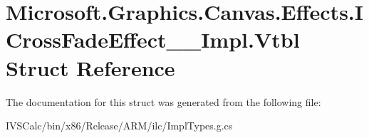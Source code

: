 \hypertarget{struct_microsoft_1_1_graphics_1_1_canvas_1_1_effects_1_1_i_cross_fade_effect_____impl_1_1_vtbl}{}\section{Microsoft.\+Graphics.\+Canvas.\+Effects.\+I\+Cross\+Fade\+Effect\+\_\+\+\_\+\+Impl.\+Vtbl Struct Reference}
\label{struct_microsoft_1_1_graphics_1_1_canvas_1_1_effects_1_1_i_cross_fade_effect_____impl_1_1_vtbl}


The documentation for this struct was generated from the following file\+:\begin{DoxyCompactItemize}
\item 
I\+V\+S\+Calc/bin/x86/\+Release/\+A\+R\+M/ilc/Impl\+Types.\+g.\+cs\end{DoxyCompactItemize}
